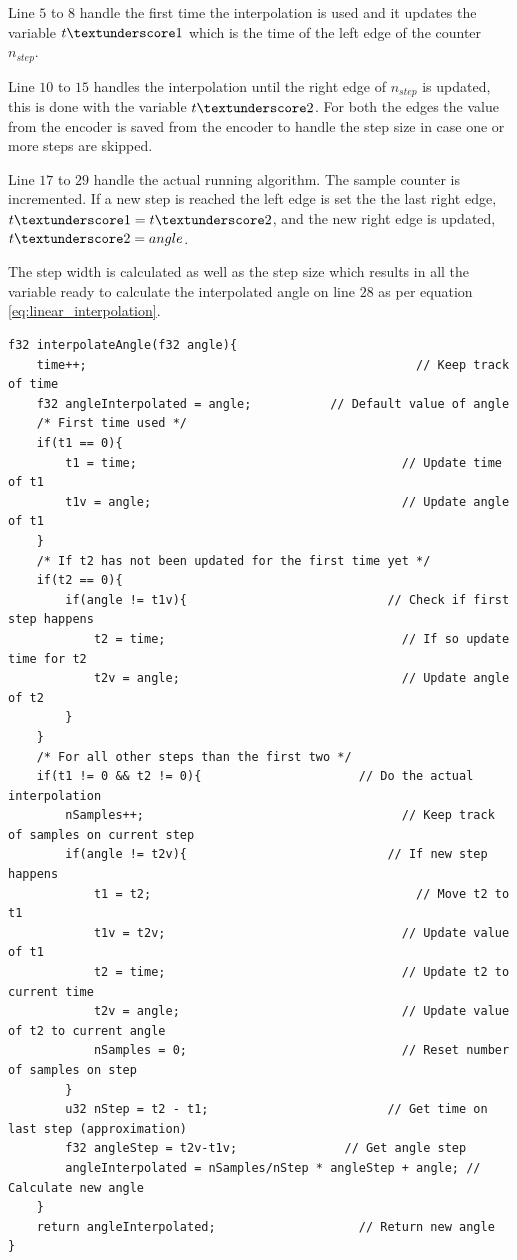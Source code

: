 Line $5$ to $8$ handle the first time the interpolation is used and it updates the variable $t\textunderscore 1$ which is the time of the left edge of the counter $n_{step}$. 

Line $10$ to $15$ handles the interpolation until the right edge of $n_{step}$ is updated, this is done with the variable $t\textunderscore 2$. For both the edges the value from the encoder is saved from the encoder to handle the step size in case one or more steps are skipped.

Line $17$ to $29$ handle the actual running algorithm. The sample counter is incremented. If a new step is reached the left edge is set the the last right edge, $t\textunderscore 1 = t\textunderscore 2$, and the new right edge is updated, $t\textunderscore 2 = angle$.

The step width is calculated as well as the step size which results in all the variable ready to calculate the interpolated angle on line $28$ as per equation \ref{eq:linear_interpolation}.

\begin{lstlisting}[style=c, caption=Interpolation algorithm implemented on the embedded system., label=code:interpolation_algorithm]
f32 interpolateAngle(f32 angle){
	time++;								                 // Keep track of time
	f32 angleInterpolated = angle;		     // Default value of angle
	/* First time used */
	if(t1 == 0){
		t1 = time;						               // Update time of t1
		t1v = angle;					               // Update angle of t1
	}
	/* If t2 has not been updated for the first time yet */
	if(t2 == 0){
		if(angle != t1v){				             // Check if first step happens
			t2 = time;					               // If so update time for t2
			t2v = angle;				               // Update angle of t2
		}
	}
	/* For all other steps than the first two */
	if(t1 != 0 && t2 != 0){				         // Do the actual interpolation
		nSamples++;						               // Keep track of samples on current step
		if(angle != t2v){				             // If new step happens
			t1 = t2;					                 // Move t2 to t1
			t1v = t2v;					               // Update value of t1
			t2 = time;					               // Update t2 to current time
			t2v = angle;				               // Update value of t2 to current angle
			nSamples = 0;				               // Reset number of samples on step
		}
 		u32 nStep = t2 - t1;				         // Get time on last step (approximation)
		f32 angleStep = t2v-t1v;	           // Get angle step
		angleInterpolated = nSamples/nStep * angleStep + angle; // Calculate new angle
	}
	return angleInterpolated;			         // Return new angle
}
\end{lstlisting}

